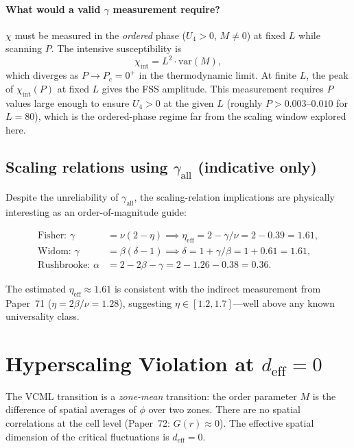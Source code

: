 \documentclass[12pt,a4paper]{article}
\begin{document}
\paragraph{What would a valid $\gamma$ measurement require?}
$\chi$ must be measured in the \emph{ordered} phase ($U_4 > 0$, $M \neq 0$) at fixed $L$
while scanning $P$.  The intensive susceptibility is
\begin{equation}
  \chi_\mathrm{int} = L^2 \cdot \mathrm{var}(M),
\end{equation}
which diverges as $P \to P_c = 0^+$ in the thermodynamic limit.  At finite $L$, the peak of
$\chi_\mathrm{int}(P)$ at fixed $L$ gives the FSS amplitude.  This measurement requires
$P$ values large enough to ensure $U_4 > 0$ at the given $L$ (roughly $P > 0.003$--$0.010$
for $L=80$), which is the ordered-phase regime far from the scaling window explored here.

\subsection{Scaling relations using $\gamma_\mathrm{all}$ (indicative only)}

Despite the unreliability of $\gamma_\mathrm{all}$, the scaling-relation implications are
physically interesting as an order-of-magnitude guide:

\begin{align}
  \text{Fisher: } \gamma &= \nu(2-\eta) \implies \eta_\mathrm{eff} = 2 - \gamma/\nu = 2 - 0.39 = 1.61, \label{eq:fisher} \\
  \text{Widom: }  \gamma &= \beta(\delta-1) \implies \delta = 1 + \gamma/\beta = 1 + 0.61 = 1.61, \label{eq:widom} \\
  \text{Rushbrooke: } \alpha &= 2 - 2\beta - \gamma = 2 - 1.26 - 0.38 = 0.36. \label{eq:rushbrooke}
\end{align}

The estimated $\eta_\mathrm{eff}\approx 1.61$ is consistent with the indirect measurement
from Paper~71 ($\eta=2\beta/\nu=1.28$), suggesting $\eta \in [1.2, 1.7]$---well above any
known universality class.

\section{Hyperscaling Violation at $d_\mathrm{eff}=0$}

The VCML transition is a \emph{zone-mean} transition: the order parameter $M$ is the
difference of spatial averages of $\phi$ over two zones.  There are no spatial correlations
at the cell level (Paper~72: $G(r)\approx 0$).  The effective spatial dimension of the
critical fluctuations is $d_\mathrm{eff}=0$.
\end{document}

